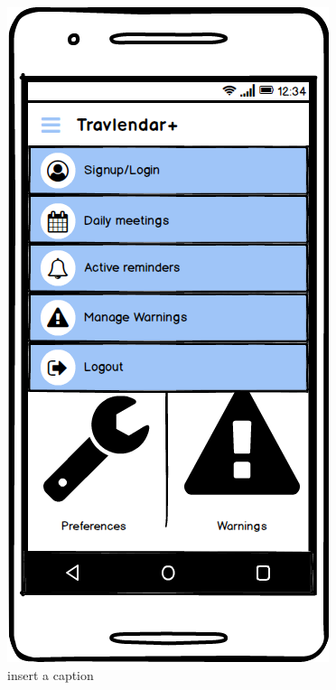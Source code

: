 \documentclass[11pt]{article}
\begin{document}
	\begin{figure}
	\centering
	\includegraphics[width=0.7\linewidth]{QuickMenu.png}
	\caption{insert a caption}
	\label{fig:quickmenu}
	\end{figure}
\end{document}
